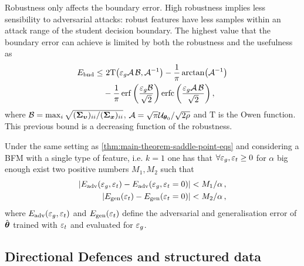 \documentclass[a0paper,fleqn]{betterportraitposter}
\theoremstyle{plain}
\theoremstyle{definition}
\theoremstyle{remark}
\begin{document}
{\begin{multicols}{3}
Robustness only affects the boundary error. 
High robustness implies less sensibility to adversarial attacks: robust features have less samples within an attack range of the student decision boundary. 
The highest value that the boundary error can achieve is limited by both the robustness and the usefulness as
\begin{align} \label{eq:bound-boundary-error}
    \bounderr \leq & \  
    2 \mathrm{T}\qty( \advgencost \mathcal{A} \, \mathcal{B}, \mathcal{A}^{-1} ) - \frac{1}{\pi} \arctan( \mathcal{A}^{-1} ) \nonumber\\ 
    & - \frac{1}{\pi} \erf\qty( \frac{\advgencost \mathcal{B}}{\sqrt{2}} ) \erfc\qty( \frac{\advgencost \mathcal{A} \, \mathcal{B}}{\sqrt{2}} ) \,,
\end{align}
where \(\mathcal{B} = \max_i \sqrt{(\boldsymbol{\Sigma}_{\boldsymbol{\upsilon}})_{ii} / (\boldsymbol{\Sigma}_{\boldsymbol{\boldsymbol{x}}})_{ii}}\), \(\mathcal{A} = \sqrt{\pi} \mathcal{U}_{\boldsymbol{\theta}_0} / \sqrt{2 \rho}\) and \(\mathrm{T}\) is the Owen function. This previous bound is a decreasing function of the robustness.


Under the same setting as \cref{thm:main-theorem-saddle-point-eqs} and considering a BFM with a single type of feature, i.e. \(k=1\) one has that \(\forall \varepsilon_g, \varepsilon_t \geq 0\) for \(\alpha\) big enough 
exist two positive numbers $M_1, M_2$ such that
\begin{equation}
\begin{aligned}
    \abs{
        E_{\mathrm{adv}}(\varepsilon_g, \varepsilon_t) - E_{\mathrm{adv}}(\varepsilon_g,  \varepsilon_t = 0)
    } & < M_1 / \alpha \,, \\
    \abs{
        E_{\mathrm{gen}}(\varepsilon_t) - E_{\mathrm{gen}}(\varepsilon_t = 0)
    } & < M_2 / \alpha \,,
\end{aligned}
\end{equation}
where \(E_{\mathrm{adv}}(\varepsilon_g, \varepsilon_t)\) and \(E_{\mathrm{gen}}(\varepsilon_t)\) define the adversarial and generalisation error of \(\hat{\boldsymbol{\theta}}\) trained with \(\varepsilon_t\) and evaluated for \(\varepsilon_g\).

\subsection{Directional Defences and structured data}


\end{multicols}}
\end{document}
